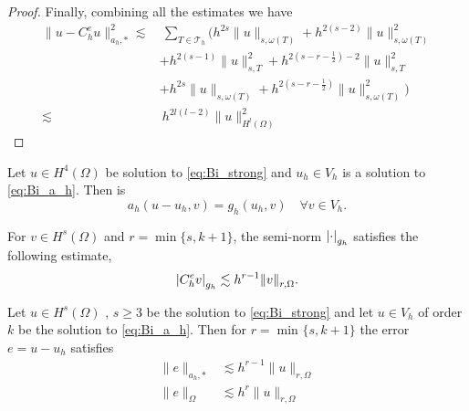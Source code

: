 \begin{proof}
    Finally, combining all the estimates we have
    \[
        \begin{split}
            \| u - C_{h}^{e}u \|_{ a_{h}, * }^{  2}  \lesssim  & \   \sum_{T \in \mathcal{T}_h}^{}  \bigg(    h^{2s}\| u \|_{s, \omega ( T)   }^{  } +  h^{2(s-2)} \| u \|_{ s, \omega ( T)  }^{ 2 } \\
             & +  h^{2(s-1)} \| u \|_{s,T }^{ 2} + h^{2(s- r- \frac{1}{2}) -2}   \| u \|_{s,T  }^{  2} \\
            & + h^{2s}  \| u \|_{s, \omega ( T)   }^{  } + h^{2(s-r -\frac{1}{2})}  \| u \|_{ s, \omega ( T)  }^{2  } \bigg) \\
            \lesssim & \ h^{2l ( l-2) } \| u \|_{H^{l}( \Omega )   }^{2  }
        \end{split}
    \]
\end{proof}

\begin{lemma}
    Let $u \in H^{4}( \Omega )  $ be solution to \eqref{eq:Bi_strong} and $u_{h} \in V_{h}$ is a solution to \eqref{eq:Bi_a_h}. Then is \[
    a_{h}( u - u_{h}, v) = g_{h} ( u_{h}, v) \quad \forall v \in V_{h}.
    \]
\end{lemma}

\begin{assumption}[EP2]
    \label{as:bi_EP2}
    For $v \in H^{s}( \Omega ) $ and $r = \min \{s,k+1 \} $, the semi-norm $\left\lvert  \cdot   \right\rvert_{g_{h}} $ satisfies the following estimate, \[
    \left\lvert  C _{h}^{e} v  \right\rvert _{g_{h}} \lesssim  h^{r-1} \| v \|_{ r,\Omega  }^{  }.
    \]
\end{assumption}


\begin{theorem}
    Let $u \in H^{s}( \Omega ) $ , $s\ge 3$ be the solution to \eqref{eq:Bi_strong} and let $u \in V_{h}$ of order $k$ be the solution to \eqref{eq:Bi_a_h}. Then for $r = \min_{}\{s, k+1\} $ the error $e = u - u_{h}$ satisfies
    \begin{align}
        \label{eq:bi_apriori_1}
            \| e \|_{ a_{h},* }^{  } &\lesssim   h^{r-1} \| u \|_{ r,\Omega  }^{  }\\
        \label{eq:bi_apriori_2}
            \| e \|_{ \Omega  }^{  } &\lesssim   h^{r} \| u \|_{ r,\Omega  }^{  }
    \end{align}

\end{theorem}

